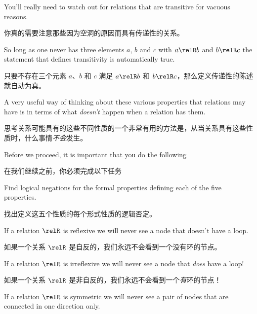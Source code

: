 You'll really need to watch out for relations that are transitive for vacuous reasons.

你真的需要注意那些因为空洞的原因而具有传递性的关系。

So long as one
never has three elements $a$, $b$ and $c$ with $a \relR b$ and $b \relR c$ the statement that defines
transitivity is automatically true.

只要不存在三个元素 $a$、$b$ 和 $c$ 满足 $a \relR b$ 和 $b \relR c$，那么定义传递性的陈述就自动为真。

A very useful way of thinking about these various properties that relations may have is in terms of 
what \emph{doesn't} happen when a relation has them.

思考关系可能具有的这些不同性质的一个非常有用的方法是，从当关系具有这些性质时，什么事情\emph{不会}发生。

Before we proceed, it is important that 
you do the following

在我们继续之前，你必须完成以下任务

\begin{exer}
Find logical negations for the formal properties defining each of the five
properties.
\end{exer}

\begin{exer}
找出定义这五个性质的每个形式性质的逻辑否定。
\end{exer}

\newpage

If a relation $\relR$ is reflexive we will never see a node that doesn't have a loop.

如果一个关系 $\relR$ 是自反的，我们永远不会看到一个没有环的节点。

\begin{center}

\end{center}

\vfill

If a relation $\relR$ is irreflexive we will never see a node that \emph{does} have a loop!

如果一个关系 $\relR$ 是非自反的，我们永远不会看到一个\emph{有}环的节点！

\begin{center}

\end{center}

\vfill

If a relation $\relR$ is symmetric we will never see a pair of nodes that are connected in one
direction only.


